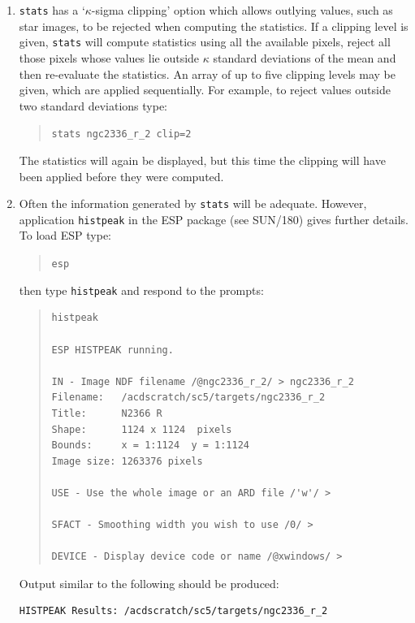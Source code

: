 \documentclass[twoside,11pt]{article}
\newcommand{\xref}[3]{#1}
\begin{document}
\begin{enumerate}
  \item {\tt stats} has a `$\kappa$-sigma clipping' option which allows
   outlying values, such as star images, to be rejected when computing
   the statistics.  If a clipping level is given, {\tt stats} will
   compute statistics using all the available pixels, reject all those
   pixels whose values lie outside $\kappa$ standard deviations of the mean
   and then re-evaluate the statistics.  An array of up to five clipping
   levels may be given, which are applied sequentially.  For example,
   to reject values outside two standard deviations type:

  \begin{quote}
   {\tt stats ngc2336\_r\_2 clip=2}
  \end{quote}

   The statistics will again be displayed, but this time the clipping
   will have been applied before they were computed.

  \item Often the information generated by {\tt stats} will be adequate.
   However, application {\tt histpeak}  in the ESP package (see
   \xref{SUN/180}{sun180}{}\/\cite{SUN180}) gives further details.  To
   load ESP type:

  \begin{quote}
   {\tt esp}
  \end{quote}

   then type {\tt histpeak} and respond to the prompts:

  \begin{quote}
  \begin{verbatim}
histpeak

ESP HISTPEAK running.

IN - Image NDF filename /@ngc2336_r_2/ > ngc2336_r_2
Filename:   /acdscratch/sc5/targets/ngc2336_r_2
Title:      N2366 R
Shape:      1124 x 1124  pixels
Bounds:     x = 1:1124  y = 1:1124
Image size: 1263376 pixels

USE - Use the whole image or an ARD file /'w'/ > 

SFACT - Smoothing width you wish to use /0/ > 

DEVICE - Display device code or name /@xwindows/ >
\end{verbatim}
  \end{quote}

   Output similar to the following should be produced:

  \begin{verbatim}
HISTPEAK Results: /acdscratch/sc5/targets/ngc2336_r_2


\end{verbatim}
\end{enumerate}
\end{document}
